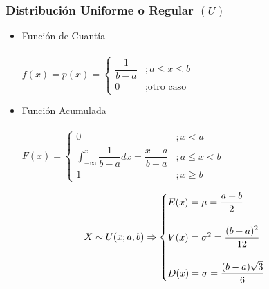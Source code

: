 \documentclass[10pt,letterpaper]{article}
\begin{document}
\subsubsection{Distribución Uniforme o Regular $(U)$}
\begin{multicols}{2}
\begin{itemize}
\item Función de Cuantía \\ \vspace{0.025cm} \\
$f(x)=p(x)=
\begin{cases}
\dfrac{1}{b-a} &; a\leq x \leq b \\
0 &; \text{otro caso}
\end{cases}$
\end{itemize}
\columnbreak
\begin{itemize}
\item Función Acumulada \\ \vspace{0.05cm} \\
$F(x)=
\begin{cases}
0 &; x<a \\
\displaystyle\int_{-\infty}^{x} \dfrac{1}{b-a} dx = \dfrac{x-a}{b-a} &;a \leq x < b \\
1 &; x\geq b
\end{cases}$
\end{itemize}
\end{multicols}
$$
X\sim U(x;a,b)\Rightarrow 
\begin{cases}
E(x)=\mu = \dfrac{a+b}{2} \\ \vspace{0.005cm} \\
V(x)=\sigma^2 = \dfrac{(b-a)^2}{12}\\ \vspace{0.005cm} \\
D(x)=\sigma= \dfrac{(b-a)\sqrt{3}}{6}
\end{cases}
$$
\end{document}
